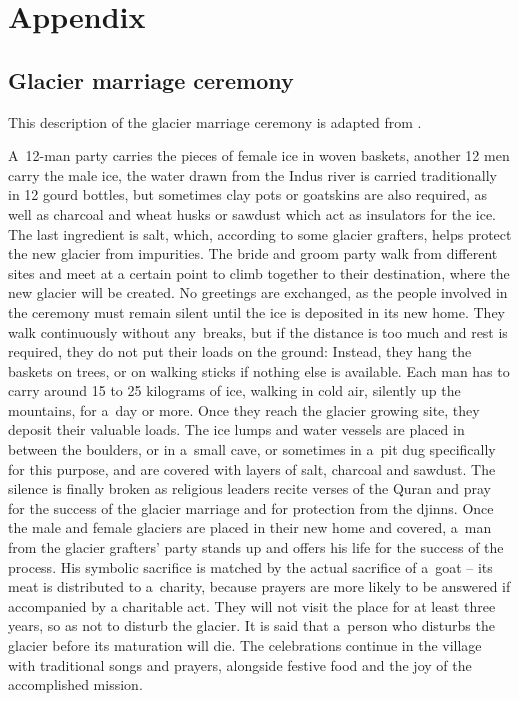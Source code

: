 \chapter{Appendix}
\label{sec:appendix}

\section{Glacier marriage ceremony}
\label{sec:glacier_marriage}

This description of the glacier marriage ceremony is adapted from \citet{khanMarriageGlaciersPrzekroj2020}.

A 12-man party carries the pieces of female ice in woven baskets, another 12 men carry the male ice, the water
drawn from the Indus river is carried traditionally in 12 gourd bottles, but sometimes clay pots or goatskins
are also required, as well as charcoal and wheat husks or sawdust which act as insulators for the ice. The last
ingredient is salt, which, according to some glacier grafters, helps protect the new glacier from impurities.
The bride and groom party walk from different sites and meet at a certain point to climb together to their
destination, where the new glacier will be created. No greetings are exchanged, as the people involved in the
ceremony must remain silent until the ice is deposited in its new home. They walk continuously without
any breaks, but if the distance is too much and rest is required, they do not put their loads on the ground:
Instead, they hang the baskets on trees, or on walking sticks if nothing else is available. Each man has to
carry around 15 to 25 kilograms of ice, walking in cold air, silently up the mountains, for a day or more. Once
they reach the glacier growing site, they deposit their valuable loads. The ice lumps and water vessels are
placed in between the boulders, or in a small cave, or sometimes in a pit dug specifically for this purpose, and
are covered with layers of salt, charcoal and sawdust. The silence is finally broken as religious leaders recite
verses of the Quran and pray for the success of the glacier marriage and for protection from the djinns. Once
the male and female glaciers are placed in their new home and covered, a man from the glacier grafters' party
stands up and offers his life for the success of the process. His symbolic sacrifice is matched by the actual
sacrifice of a goat – its meat is distributed to a charity, because prayers are more likely to be answered if
accompanied by a charitable act. They will not visit the place for at least three years, so as not to disturb
the glacier. It is said that a person who disturbs the glacier before its maturation will die. The celebrations
continue in the village with traditional songs and prayers, alongside festive food and the joy of the
accomplished mission.


